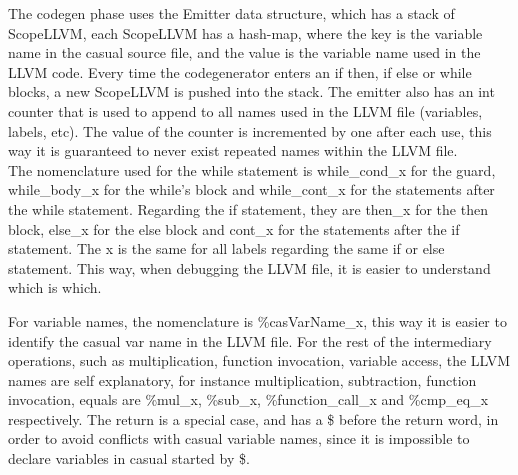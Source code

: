 \documentclass[12pt]{article}
\begin{document}
The codegen phase uses the Emitter data structure, which has a stack of ScopeLLVM, each ScopeLLVM has a hash-map, where the key is the variable name in the casual source file, and the value is the variable name used in the LLVM code. Every time the codegenerator enters an if then, if else or while blocks, a new ScopeLLVM is pushed into the stack.
The emitter also has an int counter that is used to append to all names used in the LLVM file (variables, labels, etc). The value of the counter is incremented by one after each use, this way it is guaranteed to never exist repeated names within the LLVM file.\\

The nomenclature used for the while statement is while\_cond\_x for the guard, while\_body\_x for the while's block and while\_cont\_x for the statements after the while statement.
Regarding the if statement, they are then\_x for the then block, else\_x for the else block and cont\_x for the statements after the if statement. The x is the same for all labels regarding the same if or else statement. This way, when debugging the LLVM file, it is easier to understand which is which.

For variable names, the nomenclature is \%casVarName\_x, this way it is easier to identify the casual var name in the LLVM file.
For the rest of the intermediary operations, such as multiplication, function invocation, variable access, the LLVM names are self explanatory, for instance multiplication, subtraction, function invocation, equals are \%mul\_x, \%sub\_x, \%function\_call\_x and \%cmp\_eq\_x respectively.
The return is a special case, and has a \$ before the return word, in order to avoid conflicts with casual variable names, since it is impossible to declare variables in casual started by \$.


\end{document}
